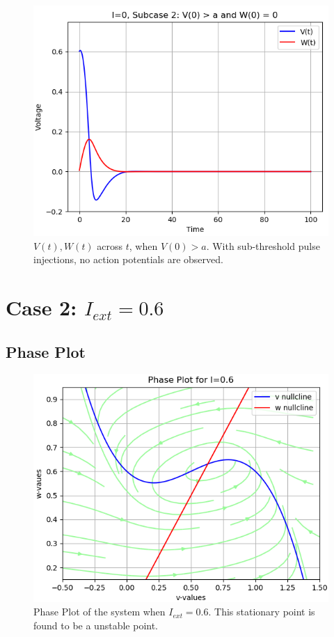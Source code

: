 \documentclass[12pt,a4paper]{article}
\begin{document}
	\begin{figure}[H]
	\centering
	\includegraphics[scale=0.6]{images/Figure_4.png}
	\caption{$V(t), W(t)$ across $t$, when $V(0)>a$. With sub-threshold pulse injections, no action potentials are observed.}
	\end{figure}

\section{Case 2: $I_{ext}=0.6$}
\subsection{Phase Plot}
	\begin{figure}[H]
	\centering
	\includegraphics[scale=0.6]{images/Figure_5.png}
	\caption{Phase Plot of the system when $I_{ext} =  0.6$. This stationary point is found to be a unstable point.}
	\end{figure}
\end{document}
